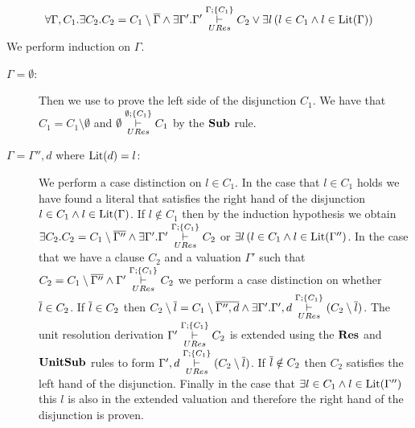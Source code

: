 \begin{mylemma}
\begin{align*}
\forall \Gamma, C_1. \exists C_2. C_2 = C_1 \setminus \overline{\Gamma} \wedge \exists \Gamma' . \Gamma' \overset{\Gamma;\{C_1 \}}{\underset{URes}{\vdash}} C_2 \vee \exists l\, (l \in C_1 \wedge l \in \mathrm{Lit}(\Gamma))
\end{align*}
We perform induction on $\Gamma$.
\begin{description}
\item[$\Gamma = \emptyset$:] Then we use to prove the left side of the disjunction $C_1$. We have that $C_1 = C_1 \setminus \emptyset$ and $\emptyset \overset{\emptyset;\{C_1 \}}{\underset{URes}{\vdash}} C_1$ by the $\mathbf{Sub}$ rule.
\item[$\Gamma = \Gamma'', d$ where $\mathrm{Lit}(d) = l$:]
We perform a case distinction on $l \in C_1$. In the case that $l \in C_1$ holds we have found a literal that satisfies the right hand of the disjunction $l \in C_1 \wedge l \in \mathrm{Lit}(\Gamma)$. If $l \notin C_1$ then by the induction hypothesis we obtain $\exists C_2. C_2 = C_1 \setminus \overline{\Gamma''} \wedge \exists \Gamma' . \Gamma' \overset{\Gamma;\{C_1 \}}{\underset{URes}{\vdash}} C_2$  or $\exists l\, (l \in C_1 \wedge l \in \mathrm{Lit}(\Gamma'')$. In the case that we have a clause $C_2$ and a valuation $\Gamma'$ such that $C_2 = C_1 \setminus \overline{\Gamma''} \wedge  \Gamma' \overset{\Gamma;\{C_1 \}}{\underset{URes}{\vdash}} C_2$ we perform a case distinction on whether $\overline{l} \in C_2$. If $\overline{l} \in C_2$ then $C_2\setminus \overline{l} = C_1 \setminus \overline{\Gamma'', d} \wedge \exists \Gamma' . \Gamma',d  \overset{\Gamma;\{C_1 \}}{\underset{URes}{\vdash}} (C_2 \setminus \overline{l})$. The unit resolution derivation $ \Gamma' \overset{\Gamma;\{C_1 \}}{\underset{URes}{\vdash}} C_2$  is extended using the $\mathbf{Res}$ and $\mathbf{UnitSub}$ rules to form  $\Gamma',d  \overset{\Gamma;\{C_1 \}}{\underset{URes}{\vdash}} (C_2 \setminus \overline{l}) $. If $\overline{l} \notin C_2$ then $C_2$ satisfies the left hand of the disjunction. Finally in the case that $\exists l \in C_1 \wedge l \in \mathrm{Lit}(\Gamma'')$  this $l$ is also in the extended valuation and therefore the right hand of the disjunction is proven.

\begin{comment}
We perform a case distinction on whether $l \in \lit(\Gamma)$ if it is then we have found a literal  such that $l \in C_1 \wedge l \in \lit(\Gamma)$. If $l \notin \lit{\Gamma}$ by the induction hypothesis we obtain $\exists C_4. C_4 = C_3 \setminus \mybar{\Gamma} \wedge \exists \Gamma'. \, \Gamma'  \clmodres{\Gamma}{\{ C_3 \}} C_4  \vee  \exists l \, (l \in C_3 \wedge l \in \lit{\Gamma})$. Leading to two further cases. In the case that  the left hand of the disjunction holds we then perform a case distinction on whether $\mybar{l} \in \Gamma$
\end{comment}

\end{description}
\label{lemma:complete5}
\end{mylemma}

